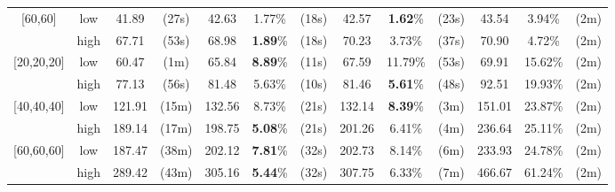 \begin{tabular}{cc|cc|ccc|ccc|ccc}
\multirow[t]{2}{*}{[60,60]} & low & 41.89 & (27s) & 42.63 & 1.77\% & (18s) & 42.57 & \textbf{1.62}\% & (23s) & 43.54 & 3.94\% & (2m) \\
 & high & 67.71 & (53s) & 68.98 & \textbf{1.89}\% & (18s) & 70.23 & 3.73\% & (37s) & 70.90 & 4.72\% & (2m) \\
\multirow[t]{2}{*}{[20,20,20]} & low & 60.47 & (1m) & 65.84 & \textbf{8.89}\% & (11s) & 67.59 & 11.79\% & (53s) & 69.91 & 15.62\% & (2m) \\
 & high & 77.13 & (56s) & 81.48 & 5.63\% & (10s) & 81.46 & \textbf{5.61}\% & (48s) & 92.51 & 19.93\% & (2m) \\
\multirow[t]{2}{*}{[40,40,40]} & low & 121.91 & (15m) & 132.56 & 8.73\% & (21s) & 132.14 & \textbf{8.39}\% & (3m) & 151.01 & 23.87\% & (2m) \\
 & high & 189.14 & (17m) & 198.75 & \textbf{5.08}\% & (21s) & 201.26 & 6.41\% & (4m) & 236.64 & 25.11\% & (2m) \\
\multirow[t]{2}{*}{[60,60,60]} & low & 187.47 & (38m) & 202.12 & \textbf{7.81}\% & (32s) & 202.73 & 8.14\% & (6m) & 233.93 & 24.78\% & (2m) \\
 & high & 289.42 & (43m) & 305.16 & \textbf{5.44}\% & (32s) & 307.75 & 6.33\% & (7m) & 466.67 & 61.24\% & (2m) \\
\end{tabular}
